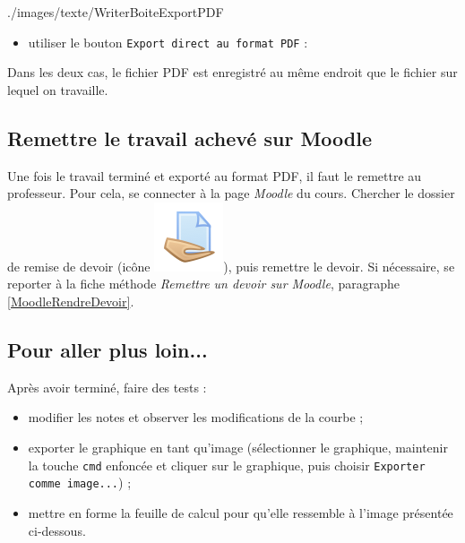 %
                {./images/texte/WriterBoiteExportPDF}{\textwidth}

\begin{itemize}\item utiliser le bouton \texttt{Export direct au format PDF} :\end{itemize} 

Dans les deux cas, le fichier PDF est enregistré au même endroit que le fichier sur lequel on travaille.






\subsection{Remettre le travail achevé sur Moodle}

Une fois le travail terminé et exporté au format PDF, il faut le remettre au professeur. Pour cela, se connecter à la page \emph{Moodle} du cours. Chercher le dossier de remise de devoir (icône \includegraphics[width=.04\textwidth]{./images/methode/MoodleDevoirIcone1}), puis remettre le devoir. Si nécessaire, se reporter à la fiche méthode \emph{Remettre un devoir sur Moodle}, paragraphe \vref{MoodleRendreDevoir}.




\subsection{Pour aller plus loin...}

Après avoir terminé, faire des tests :

\begin{itemize}
\item modifier les notes et observer les modifications de la courbe ;
\item exporter le graphique en tant qu'image (sélectionner le graphique, maintenir la touche \texttt{cmd} enfoncée et cliquer sur le graphique, puis choisir \texttt{Exporter comme image...}) ;
\item mettre en forme la feuille de calcul pour qu'elle ressemble à l'image présentée ci-dessous.
\end{itemize}


